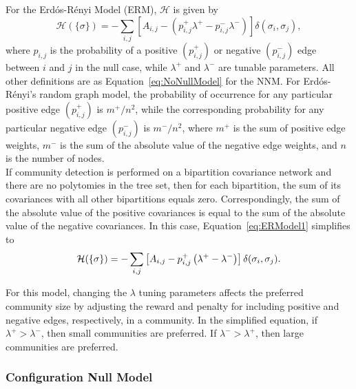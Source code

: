 \documentclass[11pt]{article}
\begin{document}
For the Erd\'{o}s-R\'{e}nyi Model (ERM), $\mathcal{H}$ is given by
\begin{equation}\label{eq:ERModel1}
\mathcal{H}(\{\sigma\}) = - \displaystyle\sum_{i,j} \left[A_{i,j} -\left(p_{i,j}^{+}\lambda^{+} - p_{i,j}^{-}\lambda^{-}\right)\right]\delta(\sigma_{i}, \sigma_{j}),
\end{equation}
where $p_{i,j}$ is the probability of a positive $(p_{i,j}^{+})$ or negative $(p_{i,j}^{-})$ edge between $i$ and $j$ in the null case, while $\lambda^{+}$ and $\lambda^{-}$ are tunable parameters. All other definitions are as Equation~\eqref{eq:NoNullModel} for the NNM. For Erd\'{o}s-R\'{e}nyi's random graph model, the probability of occurrence for any particular positive edge $(p_{i,j}^{+})$ is $m^{+} / n^{2}$, while the corresponding probability for any particular negative edge $(p_{i,j}^{-})$ is $m^{-} / n^{2}$, where $m^{+}$ is the sum of positive edge weights, $m^{-}$ is the sum of the absolute value of the negative edge weights, and $n$ is the number of nodes.\\


If community detection is performed on a bipartition covariance network and there are no
polytomies in the tree set, then for each bipartition, the sum of its covariances with all other
bipartitions equals zero. Correspondingly, the sum of the absolute value of the positive
covariances is equal to the sum of the absolute value of the negative covariances. In this case, Equation~\eqref{eq:ERModel1} simplifies to
\begin{equation}\label{eq:ERModel2}
\mathcal{H}(\{\sigma\}) = - \displaystyle\sum_{i,j} \left[A_{i,j} -p_{i,j}^{+}\left(\lambda^{+} - \lambda^{-}\right)\right]\delta(\sigma_{i}, \sigma_{j}). \\
\end{equation}


For this model, changing the $\lambda$ tuning parameters affects the preferred community size by
adjusting the reward and penalty for including positive and negative edges, respectively, in a
community. In the simplified equation, if $\lambda^{+} > \lambda^{-}$, then small communities are preferred. If $\lambda^{-} > \lambda^{+}$, then large communities are preferred. \\


\subsubsection{Configuration Null Model}\label{appendix:CNModel}
\end{document}
